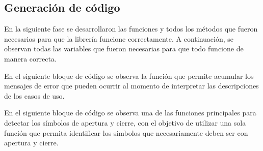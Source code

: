 
%



\subsection{Generación de código}

En la siguiente fase se desarrollaron las funciones y todos los métodos que fueron necesarios para que la librería funcione correctamente. A continuación, se observan todas las variables que fueron necesarias para que todo funcione de manera correcta.



En el siguiente bloque de código se observa la función que permite acumular los mensajes de error que pueden ocurrir al momento de interpretar las descripciones de los casos de uso. 



En el siguiente bloque de código se observa una de las funciones principales para detectar los símbolos de apertura y cierre, con el objetivo de utilizar una sola función que permita identificar los símbolos que necesariamente deben ser con apertura y cierre. 



